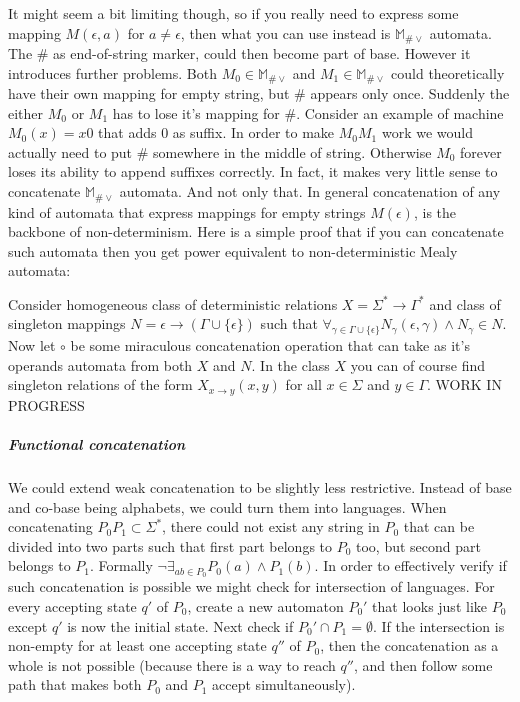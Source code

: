 \documentclass[12pt]{article}
\begin{document}
It might seem a bit limiting though, so if you really need to express some mapping $M(\epsilon,a)$ for $a\ne\epsilon$, then what you can use instead is $\mathbb{M}_{\#\vee}$ automata. The $\#$ as end-of-string marker,  could then become part of base. However it introduces further problems. Both $M_0 \in \mathbb{M}_{\#\vee}$ and $M_1 \in \mathbb{M}_{\#\vee}$ could theoretically have their own mapping for empty string, but $\#$ appears only once. Suddenly the either $M_0$ or $M_1$ has to lose it's mapping for $\#$. Consider an example of machine $M_0(x)=x0$ that adds 0 as suffix. In order to make $M_0M_1$ work we would actually need to put $\#$ somewhere in the middle of string. Otherwise $M_0$ forever loses its ability to append suffixes correctly. In fact, it makes very little sense to concatenate $\mathbb{M}_{\#\vee}$ automata. And not only that. In general concatenation of any kind of automata that express mappings for empty strings $M(\epsilon)$, is the backbone of non-determinism. Here is a simple proof that if you can concatenate such automata then you get power equivalent to non-deterministic Mealy automata:


Consider homogeneous class of deterministic relations $X = \Sigma^* \rightarrow \Gamma^*$ and class of singleton mappings $N = \epsilon \rightarrow (\Gamma\cup\{\epsilon\})$ such that $\forall_{\gamma\in\Gamma\cup\{\epsilon\}}N_\gamma(\epsilon,\gamma) \wedge N_\gamma  \in N$. Now let $\circ$ be some miraculous concatenation operation that can take as it's operands automata from both $X$ and $N$. In the class $X$ you can of course find singleton relations of the form $X_{x\rightarrow y}(x,y)$ for all $x\in \Sigma$ and $y \in \Gamma$. WORK IN PROGRESS


\subparagraph{Functional concatenation} We could extend weak concatenation to be slightly less restrictive. Instead of base and co-base being alphabets, we could turn them into languages. When concatenating $P_0P_1 \subset \Sigma^*$, there could not exist any string in $P_0$ that can be divided into two parts such that first part belongs to $P_0$ too, but second part belongs to $P_1$. Formally $\neg \exists_{ab \in P_0} P_0(a) \wedge P_1(b)$. In order to effectively verify if such concatenation is possible we might check for intersection of languages. For every accepting state $q'$ of $P_0$, create a new automaton $P_0'$ that looks just like $P_0$ except $q'$ is now the initial state.  Next check if $P_0' \cap P_1 = \emptyset$. If the intersection is non-empty for at least one accepting state $q''$ of $P_0$, then the concatenation as a whole is not possible (because there is a way to reach $q''$, and then follow some path that makes both $P_0$ and $P_1$ accept simultaneously). 
\end{document}

